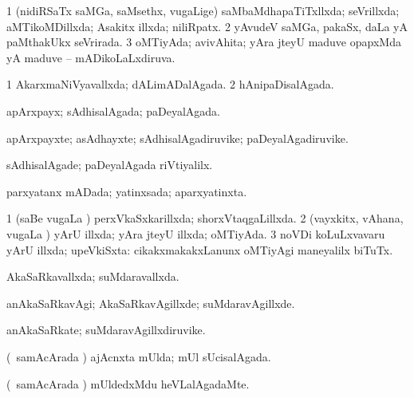 {\bentry
{} 
\gl{\gu}
\expl{}
\bmng
\bnum
\num{1} (nidiRSaTx saMGa, saMsethx, \mo vugaLige) saMbaMdhapaTiTxllxda; seVrillxda; aMTikoMDillxda; Asakitx illxda; niliRpatx. 
\num{2} yAvudeV saMGa, pakaSx, daLa yA paMthakUkx seVrirada. 
\num{3} oMTiyAda; avivAhita; yAra jteyU maduve opapxMda yA maduve -- mADikoLaLxdiruva. 
\enum
\emng
\eentry

\bentry
{} 
\gl{\gu}
\expl{}
\bmng
\bnum
\num{1} AkarxmaNiVyavallxda; dALimADalAgada. 
\num{2} hAnipaDisalAgada. 
\enum
\emng
\eentry

\bentry
{} 
\gl{\gu}
\expl{}
\bmng
apArxpayx; sAdhisalAgada; paDeyalAgada. 
\emng
\eentry

\bentry
{} 
\gl{\nA}
\expl{}
\bmng
apArxpayxte; asAdhayxte; sAdhisalAgadiruvike; paDeyalAgadiruvike. 
\emng
\eentry

\bentry
{} 
\gl{\kirxvi}
\expl{}
\bmng
sAdhisalAgade; paDeyalAgada riVtiyalilx. 
\emng
\eentry

\bentry
{} 
\gl{\gu}
\expl{}
\bmng
parxyatanx mADada; yatinxsada; aparxyatinxta. 
\emng
\eentry

\bentry
{} 
\gl{\gu}
\expl{}
\bmng
\bnum
\num{1} (saBe \mo vugaLa \vi) perxVkaSxkarillxda; shorxVtaqgaLillxda. 
\num{2} (vayxkitx, vAhana, \mo vugaLa \vi) yArU illxda; yAra jteyU illxda; oMTiyAda. 
\num{3} noVDi koLuLxvavaru yArU illxda; upeVkiSxta:  cikakxmakakxLanunx oMTiyAgi maneyalilx biTuTx. 
\enum
\emng
\eentry

\bentry
{} 
\gl{\gu}
\expl{}
\bmng
AkaSaRkavallxda; suMdaravallxda. 
\emng
\eentry

\bentry
{} 
\gl{\kirxvi}
\expl{}
\bmng
anAkaSaRkavAgi; AkaSaRkavAgillxde; suMdaravAgillxde. 
\emng
\eentry

\bentry
{} 
\gl{\nA}
\expl{}
\bmng
anAkaSaRkate; suMdaravAgillxdiruvike. 
\emng
\eentry

\bentry
{} 
\gl{\gu}
\expl{}
\bmng
(\kanmu\ samAcArada \vi) ajAcnxta mUlda; mUl sUcisalAgada. 
\emng
\eentry

\bentry
{} 
\gl{\kirxvi}
\expl{}
\bmng
(\kanmu\ samAcArada \vi) mUldedxMdu heVLalAgadaMte. 
\emng
\eentry

}

